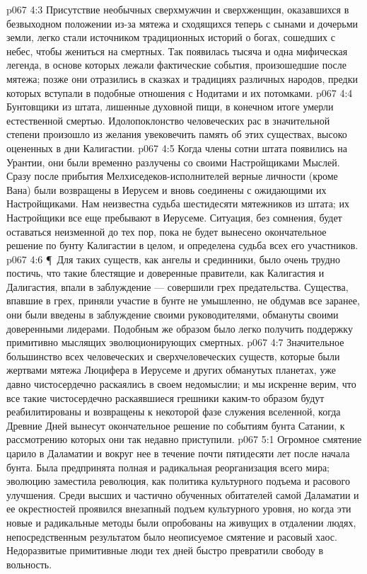 \vs p067 4:3 Присутствие необычных сверхмужчин и сверхженщин, оказавшихся в безвыходном положении из\hyp{}за мятежа и сходящихся теперь с сынами и дочерьми земли, легко стали источником традиционных историй о богах, сошедших с небес, чтобы жениться на смертных. Так появилась тысяча и одна мифическая легенда, в основе которых лежали фактические события, произошедшие после мятежа; позже они отразились в сказках и традициях различных народов, предки которых вступали в подобные отношения с Нодитами и их потомками.
\vs p067 4:4 Бунтовщики из штата, лишенные духовной пищи, в конечном итоге умерли естественной смертью. Идолопоклонство человеческих рас в значительной степени произошло из желания увековечить память об этих существах, высоко оцененных в дни Калигастии.
\vs p067 4:5 Когда члены сотни штата появились на Урантии, они были временно разлучены со своими Настройщиками Мыслей. Сразу после прибытия Мелхиседеков\hyp{}исполнителей верные личности (кроме Вана) были возвращены в Иерусем и вновь соединены с ожидающими их Настройщиками. Нам неизвестна судьба шестидесяти мятежников из штата; их Настройщики все еще пребывают в Иерусеме. Ситуация, без сомнения, будет оставаться неизменной до тех пор, пока не будет вынесено окончательное решение по бунту Калигастии в целом, и определена судьба всех его участников.
\vs p067 4:6 \P\ Для таких существ, как ангелы и срединники, было очень трудно постичь, что такие блестящие и доверенные правители, как Калигастия и Далигастия, впали в заблуждение --- совершили грех предательства. Существа, впавшие в грех, приняли участие в бунте не умышленно, не обдумав все заранее, они были введены в заблуждение своими руководителями, обмануты своими доверенными лидерами. Подобным же образом было легко получить поддержку примитивно мыслящих эволюционирующих смертных.
\vs p067 4:7 Значительное большинство всех человеческих и сверхчеловеческих существ, которые были жертвами мятежа Люцифера в Иерусеме и других обманутых планетах, уже давно чистосердечно раскаялись в своем недомыслии; и мы искренне верим, что все такие чистосердечно раскаявшиеся грешники каким\hyp{}то образом будут реабилитированы и возвращены к некоторой фазе служения вселенной, когда Древние Дней вынесут окончательное решение по событиям бунта Сатании, к рассмотрению которых они так недавно приступили.
\vs p067 5:1 Огромное смятение царило в Даламатии и вокруг нее в течение почти пятидесяти лет после начала бунта. Была предпринята полная и радикальная реорганизация всего мира; эволюцию заместила революция, как политика культурного подъема и расового улучшения. Среди высших и частично обученных обитателей самой Даламатии и ее окрестностей проявился внезапный подъем культурного уровня, но когда эти новые и радикальные методы были опробованы на живущих в отдалении людях, непосредственным результатом было неописуемое смятение и расовый хаос. Недоразвитые примитивные люди тех дней быстро превратили свободу в вольность.
